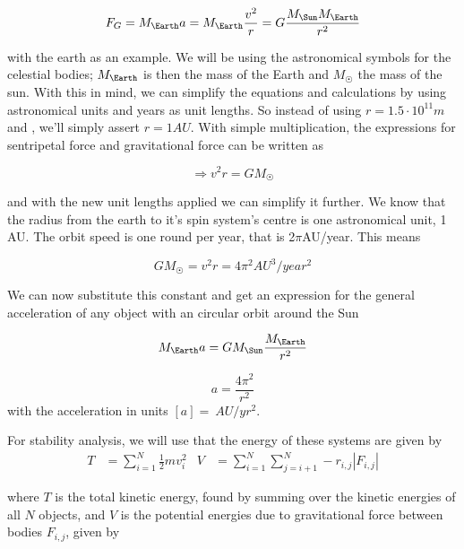 \documentclass[10pt]{article}
\begin{document}
\begin{multicols}{2}
\begin{equation}
    F_G = M_\Earth a = M_\Earth\frac{v^2}{r} = G\frac{M_\Sun M_\Earth}{r^2}
\end{equation}



with the earth as an example. We will be using the astronomical symbols for
the celestial bodies; $M_\Earth$ is then the mass of the Earth and $M_\Sun$ the mass
of the sun. With this in mind, we can simplify the equations and
calculations by using astronomical units and years as unit lengths. So
instead of using $r = 1.5\cdot10^{11}m$ and , we'll simply assert $r =
1AU$. With simple multiplication, the expressions for sentripetal force and
gravitational force can be written as 

\begin{equation}\label{eq:circVel}
    \Rightarrow v^2r = GM_\Sun
\end{equation}

and with the new unit lengths applied we can simplify it further. We know
that the radius from the earth to it's spin system's centre is one
astronomical unit, 1 AU. The orbit speed is one round per year, that is
2$\pi$AU/year. This means

\begin{equation}
    GM_\Sun = v^2r = 4\pi^2AU^3/year^2
\end{equation}

We can now substitute this constant and get an expression for the general
acceleration of any object with an circular orbit around the Sun

\begin{equation}
    M_\Earth a = GM_\Sun\frac{M_\Earth}{r^2}
\end{equation}

\begin{equation}
    a = \frac{4\pi^2}{r^2}
\end{equation}
with the acceleration in units $[a] = \SI{}{AU/yr^2}$. 

For stability analysis, we will use that the energy of these systems are given by 
\begin{align}\label{eq:energies}
    T &= \sum_{i=1}^N \frac{1}{2}mv_i^2 & V &= \sum_{i=1}^N \sum_{j=i+1}^N
    -r_{i,j}|F_{i,j}|
\end{align}

where $T$ is the total kinetic energy, found by summing over the kinetic
energies of all $N$ objects, and $V$ is the potential energies due to
gravitational force between bodies $F_{i,j}$, given by


\end{multicols}
\end{document}
